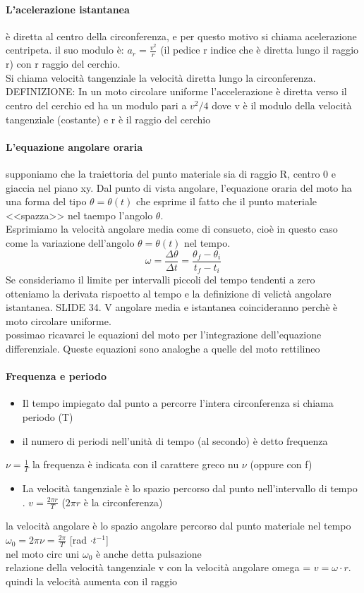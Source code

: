 \documentclass[12pt, a4paper, openany]{book}
\begin{document}
\paragraph*{L'acelerazione istantanea} è diretta al centro della circonferenza, e per questo motivo si chiama acelerazione centripeta. il suo modulo è: $a_r = \frac{v^2}{r}$ (il pedice r indice che è diretta lungo il raggio r) con r raggio del cerchio.
\\Si chiama velocità tangenziale la velocità diretta lungo la circonferenza.
\\DEFINIZIONE: In un moto circolare uniforme l'accelerazione è diretta verso il centro del cerchio ed ha un modulo pari a $v^2/4$ dove v è il modulo della velocità tangenziale (costante) e r è il raggio del cerchio
\paragraph*{L'equazione angolare oraria} supponiamo che la traiettoria del punto materiale sia di raggio R, centro 0 e giaccia nel piano xy.
Dal punto di vista angolare, l'equazione oraria del moto ha una forma del tipo $\theta = \theta(t)$ che esprime il fatto che il punto materiale <<spazza>> nel taempo l'angolo $\theta$.
\\Esprimiamo la velocità angolare media come di consueto, cioè in questo caso come la variazione dell'angolo $\theta = \theta(t)$ nel tempo.
$$\omega = \frac{\Delta \theta}{\Delta t} = \frac{\theta_f - \theta_i}{t_f - t_i}$$
Se consideriamo il limite per intervalli piccoli del tempo tendenti a zero otteniamo la derivata rispoetto al tempo e la definizione di velictà angolare istantanea. SLIDE 34.
V angolare media e istantanea coincideranno perchè è moto circolare uniforme.
\\possimao ricavarci le equazioni del moto per l'integrazione dell'equazione differenziale. Queste equazioni sono analoghe a quelle del moto rettilineo
\paragraph*{Frequenza e periodo} \begin{itemize}
    \item Il tempo impiegato dal punto a percorre l'intera circonferenza si chiama periodo (T)
    \item il numero di periodi nell'unità di tempo (al secondo) è detto frequenza
\end{itemize}
$\nu = \frac{1}{T}$ la frequenza è indicata con il carattere greco nu $\nu$ (oppure con f)
\begin{itemize}
    \item La velocità tangenziale è lo spazio percorso dal punto nell'intervallo di tempo . $v= \frac{2\pi r}{T}$ ($2\pi r$ è la circonferenza)
\end{itemize}
la velocità angolare è lo spazio angolare percorso dal punto materiale nel tempo $ \omega_0 = 2 \pi \nu = \frac{2 \pi }{T}$ [rad $\cdot t^{-1}$]
\\nel moto circ uni $\omega_0$ è anche detta pulsazione
\\relazione della velocità tangenziale v con la velocità angolare omega = $v = \omega \cdot r$. quindi la velocità aumenta con il raggio
\end{document}
